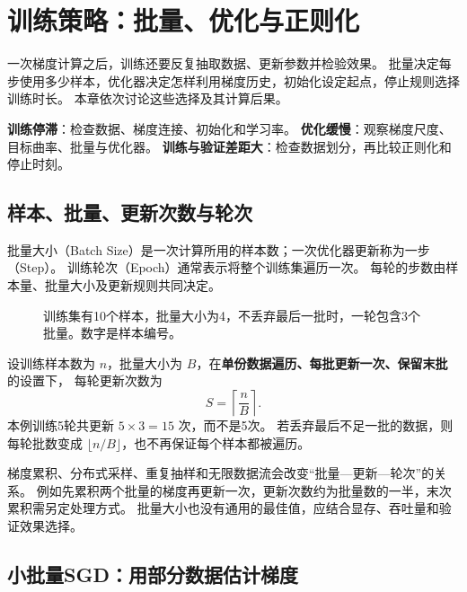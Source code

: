 \chapter{训练策略：批量、优化与正则化}
\label{ch:training}

一次梯度计算之后，训练还要反复抽取数据、更新参数并检验效果。
批量决定每步使用多少样本，优化器决定怎样利用梯度历史，初始化设定起点，停止规则选择训练时长。
本章依次讨论这些选择及其计算后果。

\begin{keyidea}[先分清三类问题]
\textbf{训练停滞}：检查数据、梯度连接、初始化和学习率。
\textbf{优化缓慢}：观察梯度尺度、目标曲率、批量与优化器。
\textbf{训练与验证差距大}：检查数据划分，再比较正则化和停止时刻。
\end{keyidea}

\section{样本、批量、更新次数与轮次}
\label{sec:train-batches}

批量大小（Batch Size）是一次计算所用的样本数；一次优化器更新称为一步（Step）。
训练轮次（Epoch）通常表示将整个训练集遍历一次。
每轮的步数由样本量、批量大小及更新规则共同决定。

\begin{figure}[htbp]
\centering

\caption{训练集有10个样本，批量大小为4，不丢弃最后一批时，一轮包含3个批量。数字是样本编号。}
\label{fig:train-batches}
\par\smallskip
{}
\end{figure}

设训练样本数为 $n$，批量大小为 $B$，在\textbf{单份数据遍历、每批更新一次、保留末批}的设置下，
每轮更新次数为
\[
 S=\left\lceil\frac nB\right\rceil.
\]
本例训练5轮共更新 $5\times3=15$ 次，而不是5次。
若丢弃最后不足一批的数据，则每轮批数变成 $\lfloor n/B\rfloor$，也不再保证每个样本都被遍历。

\begin{pitfall}[批量数与更新次数]
梯度累积、分布式采样、重复抽样和无限数据流会改变“批量—更新—轮次”的关系。
例如先累积两个批量的梯度再更新一次，更新次数约为批量数的一半，末次累积需另定处理方式。
批量大小也没有通用的最佳值，应结合显存、吞吐量和验证效果选择。
\end{pitfall}

\section{小批量SGD：用部分数据估计梯度}
\label{sec:train-sgd}

